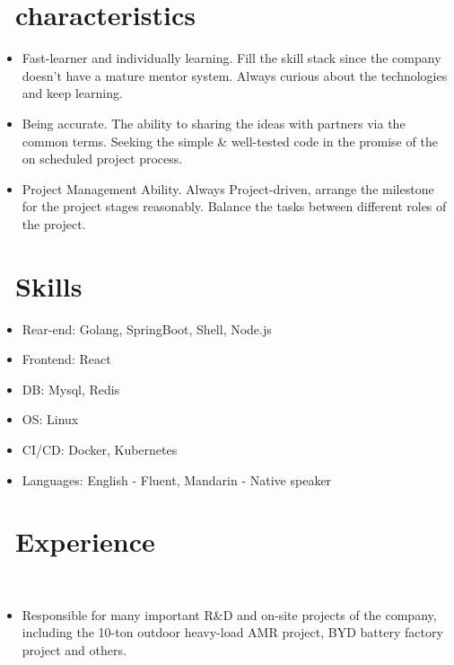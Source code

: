 \documentclass[a4paper,10pt]{resume}
\begin{document}



\section{\faLightbulbO\ characteristics}
\begin{itemize}[parsep=0.5ex]
  \item Fast-learner and individually learning. Fill the skill stack since the company doesn't have a mature mentor system. Always curious about the technologies and keep learning.
  \item Being accurate. The ability to sharing the ideas with partners via the common terms. Seeking the simple \& well-tested code in the promise of the on scheduled project process.
  \item Project Management Ability. Always Project-driven, arrange the milestone for the project stages reasonably. Balance the tasks between different roles of the project.
\end{itemize}

\section{\faCogs\ Skills}
\begin{itemize}[parsep=0.5ex]
  \item Rear-end: Golang, SpringBoot, Shell, Node.js
  \item Frontend: React
  \item DB: Mysql, Redis
  \item OS: Linux
  \item CI/CD: Docker, Kubernetes
  \item Languages: English - Fluent, Mandarin - Native speaker
\end{itemize}

\section{\faUsers\ Experience}
\\
\begin{itemize}[parsep=0.5ex]
  \item Responsible for many important R\&D and on-site projects of the company, including the 10-ton outdoor heavy-load AMR project, BYD battery factory project and others.
\end{itemize}
\end{document}
